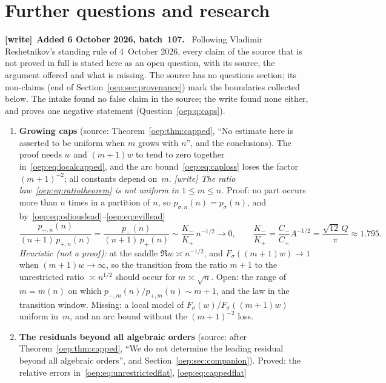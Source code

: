 \documentclass[11pt,letterpaper]{article}
\theoremstyle{remark}\newtheorem{remark}[theorem]{Remark}
\newenvironment{writenote}[1][]{\par\smallskip\begingroup\small
 \noindent\textbf{[write]}\if\relax\detokenize{#1}\relax\else~\textbf{#1.}\fi\ }%
 {\par\endgroup\smallskip}
\begin{document}
\section{Further questions and research}\label{oep:sec:further}
\begin{writenote}[Added 6 October 2026, batch~107]
Following Vladimir Reshetnikov's standing rule of 4~October 2026, every
claim of the source that is not proved in full is stated here as an open
question, with its source, the argument offered and what is missing. The
source has no questions section; its non-claims (end of
Section~\ref{oep:sec:provenance}) mark the boundaries collected below. The
intake found no false claim in the source; the write found none either, and
proves one negative statement (Question~\ref{oep:q:caps}).
\end{writenote}
\begin{enumerate}
\item\label{oep:q:caps} \textbf{Growing caps} (source:
 Theorem~\ref{oep:thm:capped}, ``No estimate here is asserted to be uniform
 when $m$ grows with $n$'', and the conclusions). The proof needs $w$ and
 $(m+1)w$ to tend to zero together in~\eqref{oep:eq:localcapped}, and the arc
 bound~\eqref{oep:eq:caploss} loses the factor $(m+1)^{-2}$; all constants
 depend on~$m$. \emph{[write] The ratio law~\eqref{oep:eq:ratiotheorem} is
 not uniform in $1\le m\le n$.} Proof: no part occurs more than $n$ times in
 a partition of $n$, so $p_{\sigma,n}(n)=p_\sigma(n)$, and
 by~\eqref{oep:eq:odiouslead}--\eqref{oep:eq:evillead}
 \[
  \frac{p_{-,n}(n)}{(n+1)\,p_{+,n}(n)}
  =\frac{p_-(n)}{(n+1)\,p_+(n)}\sim\frac{K_-}{K_+}\,n^{-1/2}\longrightarrow0,
  \qquad \frac{K_-}{K_+}=\frac{C_-}{C_+}A^{-1/2}=\frac{\sqrt{12}\,Q}{\pi}\approx1.795 .
 \]
 \emph{Heuristic (not a proof):} at the saddle $\Re w\asymp n^{-1/2}$, and
 $F_\sigma((m+1)w)\to1$ when $(m+1)w\to\infty$, so the transition from the
 ratio $m+1$ to the unrestricted ratio $\asymp n^{1/2}$ should occur for
 $m\asymp\sqrt n$. Open: the range of $m=m(n)$ on which
 $p_{-,m}(n)/p_{+,m}(n)\sim m+1$, and the law in the transition window.
 Missing: a local model of $F_\sigma(w)/F_\sigma((m+1)w)$ uniform in~$m$,
 and an arc bound without the $(m+1)^{-2}$ loss.
\item\label{oep:q:residual} \textbf{The residuals beyond all algebraic
 orders} (source: after Theorem~\ref{oep:thm:capped}, ``We do not determine
 the leading residual beyond all algebraic orders'', and
 Section~\ref{oep:sec:companion}). Proved: the relative errors
 in~\eqref{oep:eq:unrestrictedflat}, \eqref{oep:eq:cappedflat}

\end{enumerate}
\end{document}
